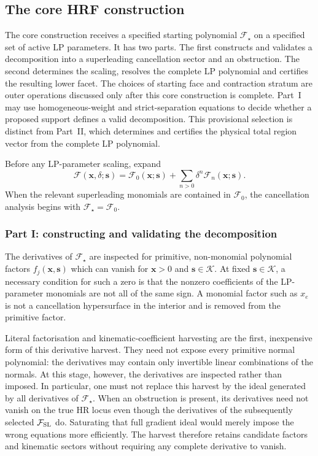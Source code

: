 \documentclass[a4paper,11pt]{article}
\newcommand{\x}{\boldsymbol{x}}
\newcommand{\s}{\boldsymbol{s}}
\newcommand{\K}{\mathcal K}
\newcommand{\FSL}{\mathcal F_{\rm SL}}
\begin{document}
\subsection{The core HRF construction}
\label{sec:ordinary}

The core construction receives a specified starting polynomial
\(\mathcal F_\star\) on a specified set of active LP parameters.  It has two
parts.  The first constructs and validates a decomposition into a
superleading cancellation sector and an obstruction.  The second determines
the scaling, resolves the complete LP polynomial and certifies the resulting
lower facet.  The choices of starting face and contraction stratum are outer
operations discussed only after this core construction is complete.
Part~I may use homogeneous-weight and strict-separation equations to decide
whether a proposed support defines a valid decomposition.  This provisional
selection is distinct from Part~II, which determines and certifies the
physical total region vector from the complete LP polynomial.

Before any LP-parameter scaling, expand
\begin{equation}
 \mathcal F(\x,\delta;\s)
 =
 \mathcal F_0(\x;\s)
 +\sum_{n>0}\delta^n\mathcal F_n(\x;\s).
\label{eq:Fexpansion}
\end{equation}
When the relevant superleading monomials are contained in
\(\mathcal F_0\), the cancellation analysis begins with
\(\mathcal F_\star=\mathcal F_0\).

\subsubsection{Part I: constructing and validating the decomposition}

The derivatives of \(\mathcal F_\star\) are inspected for primitive,
non-monomial polynomial factors \(f_j(\x,\s)\) which can vanish for
\(\x>0\) and \(\s\in\K\).  At fixed \(\s\in\K\), a necessary condition
for such a zero is that the nonzero coefficients of the LP-parameter
monomials are not all of the same sign.  A
monomial factor such as \(x_e\) is not a cancellation hypersurface in the
interior and is removed from the primitive factor.

Literal factorisation and kinematic-coefficient harvesting are the first,
inexpensive form of this derivative harvest.  They need not expose every
primitive normal polynomial: the derivatives may contain only invertible
linear combinations of the normals.  At this stage, however, the derivatives
are inspected rather than imposed.  In particular, one must not replace this
harvest by the ideal generated by all derivatives of \(\mathcal F_\star\).
When an obstruction is present, its derivatives need not vanish on the true
HR locus even though the derivatives of the subsequently selected
\(\FSL\) do.  Saturating that full gradient ideal would merely impose the
wrong equations more efficiently.  The harvest therefore retains candidate
factors and kinematic sectors without requiring any complete derivative to
vanish.
\end{document}
